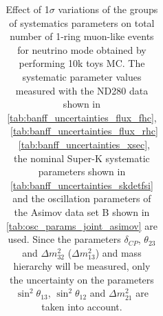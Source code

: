 \begin{table}[htb]
\begin{tabular}{| c | c | c |}
\end{tabular}
\caption{
 Effect of 1$\sigma$ variations of the groups of systematics parameters on total number of
 1-ring muon-like events for neutrino mode obtained by performing 10k toys MC.
The systematic parameter values measured with the ND280 data 
shown in 
\cref{tab:banff_uncertainties_flux_fhc},
~\ref{tab:banff_uncertainties_flux_rhc}
~\ref{tab:banff_uncertainties_xsec},
the nominal Super-K systematic parameters shown in \cref{tab:banff_uncertainties_skdetfsi}
and the oscillation parameters of the Asimov data set B shown in \cref{tab:osc_params_joint_asimov}
are used.
Since the parameters $\delta_{CP}$, $\theta_{23}$ and $\Delta m^2_{32}$ ($\Delta m^2_{13}$) and mass hierarchy
will be measured,
only the uncertainty on the parameters 
$\sin^2 \theta_{13}$,
$\sin^2 \theta_{12}$
and 
$\Delta m^2_{21}$ 
are taken into account.
}                                                                                                                                                                                          
\label{tab:nsk_systematic_table_summary_joint_asimov_B_fhc_mulike_Run17c}
\end{table}






